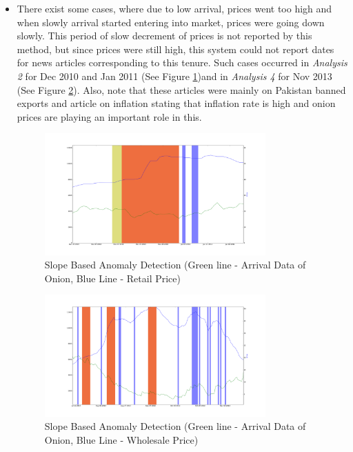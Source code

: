\documentclass[a4paper,10pt]{report}
\begin{document}
\begin{itemize}
			\item There exist some cases, where due to low arrival, prices went too high and when slowly arrival started entering into market, prices were going down slowly. This period of slow decrement of prices is not reported by this method, but since prices were still high, this system could not report dates for news articles corresponding to this tenure. Such cases occurred in \textit{Analysis 2} for Dec 2010 and Jan 2011 (See Figure \ref{fig:12124})and in \textit{Analysis 4} for Nov 2013 (See Figure \ref{fig:12144}). Also, note that these articles were mainly on Pakistan banned exports and article on inflation stating that inflation rate is high and onion prices are playing an important role in this.
			
			\begin{figure}[H]
		    	\centering
  		    	\includegraphics[width=0.8\textwidth]{graphs/12124.png}
		    	\caption{Slope Based Anomaly Detection (Green line - Arrival Data of Onion, Blue Line - Retail Price)}
		    	\label{fig:12124}
			\end{figure}
			
			\begin{figure}[H]
		    	\centering
  		    	\includegraphics[width=0.8\textwidth]{graphs/12144.png}
		    	\caption{Slope Based Anomaly Detection (Green line - Arrival Data of Onion, Blue Line - Wholesale Price)}
		    	\label{fig:12144}
			\end{figure}
			

\end{itemize}
\end{document}
